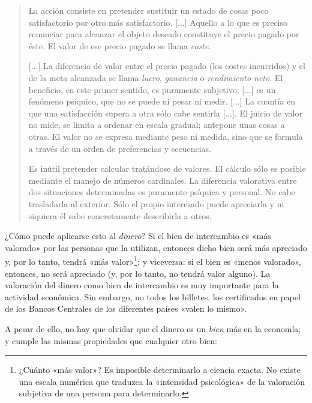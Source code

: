 \documentclass[12pt,a4paper,twoside]{book}
\begin{document}
\begin{quotation}
La acción consiste en pretender sustituir un estado de cosas poco satisfactorio por otro más satisfactorio. [...] Aquello a lo que es preciso renunciar para alcanzar el objeto deseado constituye el precio pagado por éste. El valor de ese precio pagado se llama \textit{coste}.

[...] La diferencia de valor entre el precio pagado (los costes incurridos) y el de la meta alcanzada se llama \textit{lucro}, \textit{ganancia} o \textit{rendimiento neto}. El beneficio, en este primer sentido, es puramente subjetivo; [...] es un fenómeno psíquico, que no se puede ni pesar ni medir. [...] La cuantía en que una satisfacción supera a otra sólo cabe sentirla [...]. El juicio de valor no mide, se limita a ordenar en escala gradual; antepone unas cosas a otras. El valor no se expresa mediante peso ni medida, sino que se formula a través de un orden de preferencias y secuencias.

Es inútil pretender calcular tratándose de valores. El cálculo sólo es posible mediante el manejo de números cardinales. La diferencia valorativa entre dos situaciones determinadas es puramente psíquica y personal. No cabe trasladarla al exterior. Sólo el propio interesado puede apreciarla y ni siquiera él sabe concretamente describirla a otros. \cite[pág. 117]{mises:lah}
\end{quotation}

¿Cómo puede aplicarse esto al \textit{dinero}? Si el bien de intercambio es «más valorado» por las personas que la utilizan, entonces dicho bien será más apreciado y, por lo tanto, tendrá «más valor»\footnote{¿Cuánto «más valor»? Es imposible determinarlo a ciencia exacta. No existe una escala numérica que traduzca la «intensidad psicológica» de la valoración subjetiva de una persona para determinarlo.}; y viceversa: si el bien es «menos valorado», entonces, no será apreciado (y, por lo tanto, no tendrá valor alguno). La valoración del dinero como bien de intercambio es muy importante para la actividad económica. Sin embargo, no todos los billetes, los certificados en papel de los Bancos Centrales de los diferentes países «valen lo mismo».

A pesar de ello, no hay que olvidar que el dinero es un \textit{bien} más en la economía; y cumple las mismas propiedades que cualquier otro bien:
\end{document}
